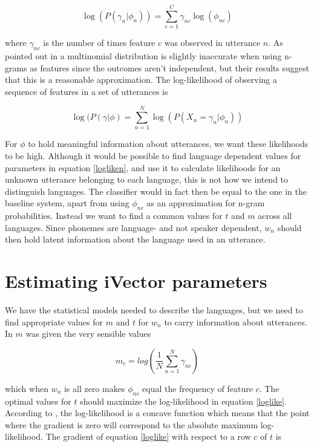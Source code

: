 \begin{equation}\label{logliken}
\log(P(\gamma_n |\phi_n)) = \sum_{c=1}^{C}\gamma_{nc}\log(\phi_{nc})
\end{equation}

where $\gamma_{nc}$ is the number of times feature $c$ was observed in utterance $n$. As pointed out in \cite{liiVector} a multinomial distribution is slightly inaccurate when using n-grams as features since the outcomes aren't independent, but their results suggest that this is a reasonable approximation. The log-likelihood of observing a sequence of features in a set of utterances is

\begin{equation}\label{loglike}
\log(P(\gamma |\phi) = \sum_{n=1}^{N}\log(P(X_n=\gamma_n |\phi_n))
\end{equation}

For $\phi$ to hold meaningful information about utterances, we want these likelihoods to be high. Although it would be possible to find language dependent values for parameters in equation \ref{logliken}, and use it to calculate likelihoods for an unknown utterance belonging to each language, this is not how we intend to distinguish languages. The classifier would in fact then be equal to the one in the baseline system, apart from using $\phi_{nc}$ as an approximation for n-gram probabilities. Instead we want to find a common values for $t$ and $m$ across all languages. Since phonemes are language- and not speaker dependent, $w_n$ should then hold latent information about the language used in an utterance. 

\section{Estimating iVector parameters}
\label{itrain}

We have the statistical models needed to describe the languages, but we need to find appropriate values for $m$ and $t$ for $w_n$ to carry information about utterances. In \cite{liiVector} $m$ was given the very sensible values

\begin{equation}\label{optm}
m_c=log\left(\frac{1}{N}\sum_{n=1}^{N}\gamma_{nc}\right)
\end{equation}

which when $w_n$ is all zero makes $\phi_{nc}$ equal the frequency of feature $c$. The optimal values for $t$ should maximize the log-likelihood in equation \ref{loglike}. According to \cite{liiVector}, the log-likelihood is a concave function which means that the point where the gradient is zero will correspond to the absolute maximum log-likelihood. The gradient of equation \ref{loglike} with respect to a row $c$ of $t$ is

